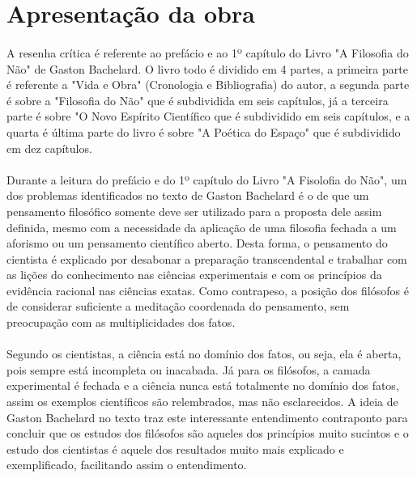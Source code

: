 \documentclass[11pt]{article}
\begin{document}
\section{Apresentação da obra}

\paragraph{}
    A resenha crítica é referente ao prefácio e ao 1º capítulo do Livro "A Filosofia do Não" de Gaston Bachelard. O livro todo é dividido em 4 partes, a primeira parte é referente a "Vida e Obra" (Cronologia e Bibliografia) do autor, a segunda parte é sobre a "Filosofia do Não" que é subdividida em seis capítulos, já a terceira parte é sobre "O Novo Espírito Científico que é subdividido em seis capítulos, e a quarta é última parte do livro é sobre "A Poética do Espaço" que é subdividido em dez capítulos.

\paragraph{}
    Durante a leitura do prefácio e do 1º capítulo do Livro "A Fisolofia do Não", um dos problemas identificados no texto de Gaston Bachelard é o de que um pensamento filosófico somente deve ser utilizado para a proposta dele assim definida, mesmo com a necessidade da aplicação de uma filosofia fechada a um aforismo ou um pensamento científico aberto. Desta forma, o pensamento do cientista é explicado por desabonar a preparação transcendental e trabalhar com as lições do conhecimento nas ciências experimentais e com os princípios da evidência racional nas ciências exatas. Como contrapeso, a posição dos filósofos é de considerar suficiente a meditação coordenada do pensamento, sem preocupação com as multiplicidades dos fatos.

\paragraph{}
    Segundo os cientistas, a ciência está no domínio dos fatos, ou seja, ela é aberta, pois sempre está incompleta ou inacabada. Já para os filósofos, a camada experimental é fechada e a ciência nunca está totalmente no domínio dos fatos, assim os exemplos científicos são relembrados, mas não esclarecidos. A ideia de Gaston Bachelard no texto traz este interessante entendimento contraponto para concluir que os estudos dos filósofos são aqueles dos princípios muito sucintos e o estudo dos cientistas é aquele dos resultados muito mais explicado e exemplificado, facilitando assim o entendimento.  
\end{document}
